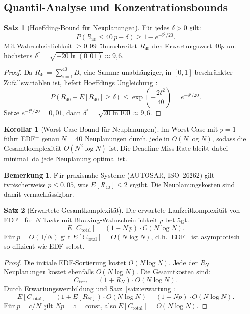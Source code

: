 ﻿\documentclass[a4paper,12pt]{article}
\theoremstyle{definition}
\newtheorem{satz}{Satz}
\newtheorem{bemerkung}{Bemerkung}
\newtheorem{korollar}{Korollar}
\begin{document}
	\subsection{Quantil-Analyse und Konzentrationsbounds}
	
	\begin{satz}[Hoeffding-Bound für Neuplanungen]
		\label{satz:hoeffding}
		Für jedes $\delta > 0$ gilt:
		\[
		P\!\left(R_{40} \le 40\,p + \delta\right) \ge 1 - e^{-\delta^2/20}.
		\]
		Mit Wahrscheinlichkeit $\ge 0{,}99$ überschreitet $R_{40}$ den Erwartungswert
		$40p$ um höchstens $\delta^* = \sqrt{-20\ln(0{,}01)} \approx 9{,}6$.
	\end{satz}
	
	\begin{proof}
		Da $R_{40} = \sum_{i=1}^{40} B_i$ eine Summe unabhängiger, in $[0,1]$
		beschränkter Zufallsvariablen ist, liefert Hoeffdings Ungleichung \cite{Hoeffding1963}:
		\[
		P(R_{40} - E[R_{40}] \ge \delta) \le \exp\!\!\left(-\frac{2\delta^2}{40}\right) = e^{-\delta^2/20}.
		\]
		Setze $e^{-\delta^2/20} = 0{,}01$, dann $\delta^* = \sqrt{20 \ln 100} \approx 9{,}6$.
	\end{proof}
	
	\begin{korollar}[Worst-Case-Bound für Neuplanungen]
		Im Worst-Case mit $p=1$ führt EDF$^+$ genau $N=40$ Neuplanungen durch,
		jede in $O(N\log N)$, sodass die Gesamtkomplexität $O(N^2 \log N)$ ist.
		Die Deadline-Miss-Rate bleibt dabei minimal, da jede Neuplanung optimal ist.
	\end{korollar}
	
	\begin{bemerkung}
		Für praxisnahe Systeme (AUTOSAR, ISO~26262) gilt typischerweise $p \le 0{,}05$,
		was $E[R_{40}] \le 2$ ergibt. Die Neuplanungskosten sind damit vernachlässigbar.
	\end{bemerkung}
	
	\begin{satz}[Erwartete Gesamtkomplexität]
		\label{satz:komplex}
		Die erwartete Laufzeitkomplexität von EDF$^+$ für $N$ Tasks mit
		Blocking-Wahrscheinlichkeit $p$ beträgt:
		\[
		E[C_{\text{total}}] = (1 + N\,p) \cdot O(N\log N).
		\]
		Für $p = O(1/N)$ gilt $E[C_{\text{total}}] = O(N \log N)$, d.\,h.\
		EDF$^+$ ist asymptotisch so effizient wie EDF selbst.
	\end{satz}
	
	\begin{proof}
		Die initiale EDF-Sortierung kostet $O(N\log N)$. Jede der $R_N$ Neuplanungen
		kostet ebenfalls $O(N\log N)$. Die Gesamtkosten sind:
		\[
		C_{\text{total}} = (1 + R_N) \cdot O(N\log N).
		\]
		Durch Erwartungswertbildung und Satz~\ref{satz:erwartung}:
		\[
		E[C_{\text{total}}] = (1 + E[R_N]) \cdot O(N\log N) = (1 + Np) \cdot O(N\log N).
		\]
		Für $p = c/N$ gilt $Np = c = \mathrm{const}$, also $E[C_{\text{total}}] = O(N\log N)$.
	\end{proof}
	
\end{document}
